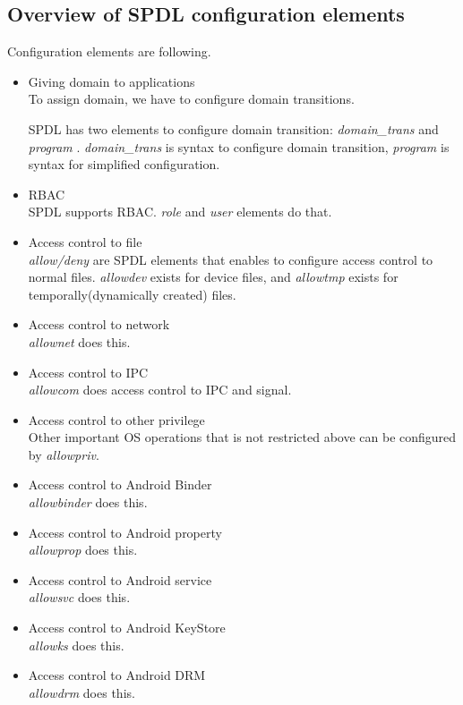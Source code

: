 \documentclass{article}
\begin{document}
\subsection{Overview of SPDL configuration elements}
Configuration elements are following.
\begin{itemize}
 \item Giving domain to applications\\
       To assign domain, we  have to configure domain transitions. 
       
       SPDL has two elements to configure domain transition:  {\it domain\_trans} and  {\it
       program} .
       {\it domain\_trans} is syntax to configure domain transition,
       {\it program} is syntax for simplified configuration.

 \item RBAC\\
       SPDL supports RBAC. {\it role} and {\it user} elements do that.
 \item Access control to file\\       
       {\it allow/deny} are SPDL elements that enables to configure
       access control to normal files. {\it allowdev} exists for device
       files, and {\it allowtmp} exists for temporally(dynamically
       created) files.
 \item Access control to network\\
       {\it allownet} does this.
 \item Access control to IPC\\
       {\it allowcom} does access control to IPC and signal.
 \item Access control to other privilege\\
       Other important OS operations that is not restricted above can be
       configured by {\it allowpriv}.
 \item Access control to Android Binder\\
       {\it allowbinder} does this.
 \item Access control to Android property\\
       {\it allowprop} does this.
 \item Access control to Android service\\
       {\it allowsvc} does this.
 \item Access control to Android KeyStore\\
       {\it allowks} does this.
 \item Access control to Android DRM\\
       {\it allowdrm} does this.
\end{itemize}
\end{document}
